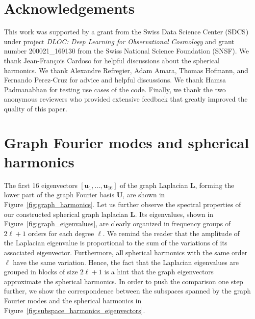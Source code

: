 \documentclass[final,twocolumn,3p,times,sort&compress]{elsarticle}
\newcommand{\figref}[1]{Figure~\ref{fig:#1}}
\renewcommand{\b}[1]{{\bm{#1}}}   %
\newcommand{\1}{\b{1}}              %
\newcommand{\0}{\b{0}}              %
\renewcommand{\L}{\b{L}}
\newcommand{\U}{\b{U}}
\begin{document}
\section*{Acknowledgements}

This work was supported by a grant from the Swiss Data Science Center (SDCS) under project \textit{DLOC:  Deep Learning for Observational Cosmology} and grant number 200021\_169130 from the Swiss National Science Foundation (SNSF).
We thank Jean-François Cardoso for helpful discussions about the spherical harmonics.
We thank Alexandre Refregier, Adam Amara, Thomas Hofmann, and Fernando Perez-Cruz for advice and helpful discussions.
We thank Hamsa Padmanabhan for testing use cases of the code.
Finally, we thank the two anonymous reviewers who provided extensive feedback that greatly improved the quality of this paper.

\appendix

\section{Graph Fourier modes and spherical harmonics}
\label{sec:comparison_spherical_harmonics}

The first 16 eigenvectors $[\b u_1, \ldots, \b u_{16}]$ of the graph Laplacian $\L$, forming the lower part of the graph Fourier basis $\U$, are shown in \figref{graph_harmonics}.
Let us further observe the spectral properties of our constructed spherical graph laplacian $\L$.
Its eigenvalues, shown in \figref{graph_eigenvalues}, are clearly organized in frequency groups of $2\ell + 1$ orders for each degree $\ell$.
We remind the reader that the amplitude of the Laplacian eigenvalue is proportional to the sum of the variations of its associated eigenvector. Furthermore, all spherical harmonics with the same order $\ell$ have the same variation. Hence, the fact that the Laplacian eigenvalues are grouped in blocks of size $2\ell + 1$ is a hint that the graph eigenvectors approximate the spherical harmonics.
In order to push the comparison one step further, we show the correspondence between the subspaces spanned by the graph Fourier modes and the spherical harmonics in \figref{subspace_harmonics_eigenvectors}.
\end{document}
